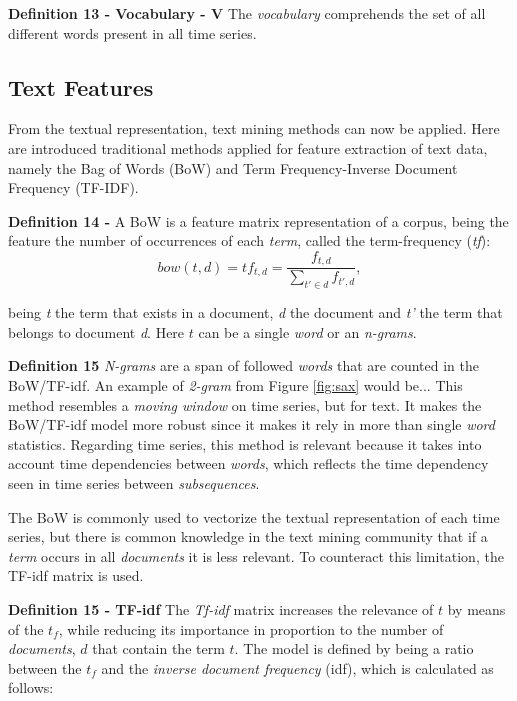\item \textbf{Definition 13 - Vocabulary - V} The \textit{vocabulary} comprehends the set of all different words present in all time series.

\subsection{Text Features}
\label{subsec:text_features}

From the textual representation, text mining methods can now be applied. Here are introduced traditional methods applied for feature extraction of text data, namely the Bag of Words (BoW) and  Term Frequency-Inverse Document Frequency (TF-IDF).
\par

\item \textbf{Definition 14 - } A BoW is a feature matrix representation of a corpus, being the feature the number of occurrences of each \textit{term}, called the term-frequency (\textit{tf}):
\begin{equation}
\label{eq:tf}
    bow(t,d) = tf_{t, d} = \frac{f_{t,d}}{\sum\limits_{t'\in d} f_{t',d}}, 
\end{equation}

being \textit{t} the term that exists in a document, \textit{d} the document and \textit{t'} the term that belongs to document \textit{d}. Here $t$ can be a single \textit{word} or an \textit{n-grams}.

\item \textbf{Definition 15} \textit{N-grams} are a span of followed \textit{words} that are counted in the BoW/TF-idf. An example of \textit{2-gram} from Figure \ref{fig:sax} would be...
This method resembles a \textit{moving window} on time series, but for text. It makes the BoW/TF-idf model more robust since it makes it rely in more than single \textit{word} statistics. Regarding time series, this method is relevant because it takes into account time dependencies between \textit{words}, which reflects the time dependency seen in time series between \textit{subsequences}.


The BoW is commonly used to vectorize the textual representation of each time series, but there is common knowledge in the text mining community that if a \textit{term} occurs in all \textit{documents} it is less relevant. To counteract this limitation, the TF-idf matrix is used.

\item \textbf{Definition 15 - TF-idf} The \textit{Tf-idf} matrix increases the relevance of $t$ by means of the $t_f$, while reducing its importance in proportion to the number of \textit{documents}, $d$ that contain the term $t$. The model is defined by being a ratio between the $t_f$ and the \textit{inverse document frequency} (idf), which is calculated as follows:

